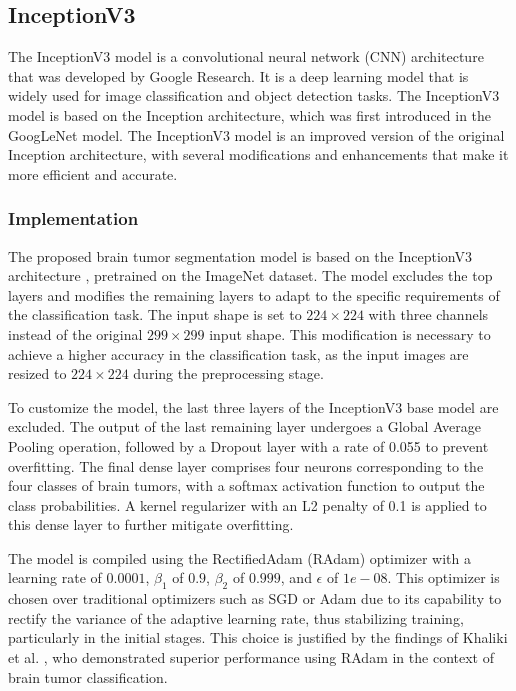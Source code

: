 \subsection{InceptionV3}\label{inceptionv3}

The InceptionV3 model is a convolutional neural network (CNN) architecture that was developed by Google Research. It is a deep learning model that is widely used for image classification and object detection tasks. The InceptionV3 model is based on the Inception architecture, which was first introduced in the GoogLeNet model. The InceptionV3 model is an improved version of the original Inception architecture, with several modifications and enhancements that make it more efficient and accurate.

\subsubsection{Implementation}


The proposed brain tumor segmentation model is based on the InceptionV3 architecture \cite{szegedy_rethinking_2015}, pretrained on the ImageNet dataset. The model excludes the top layers and modifies the remaining layers to adapt to the specific requirements of the classification task. The input shape is set to $224\times224$ with three channels instead of the original $299\times299$ input shape. This modification is necessary to achieve a higher accuracy in the classification task, as the input images are resized to $224\times224$ during the preprocessing stage.

To customize the model, the last three layers of the InceptionV3 base model are excluded. The output of the last remaining layer undergoes a Global Average Pooling operation, followed by a Dropout layer with a rate of 0.055 to prevent overfitting. The final dense layer comprises four neurons corresponding to the four classes of brain tumors, with a softmax activation function to output the class probabilities. A kernel regularizer with an L2 penalty of 0.1 is applied to this dense layer to further mitigate overfitting.

The model is compiled using the RectifiedAdam (RAdam) optimizer \cite{liu_variance_2019} with a learning rate of $0.0001$, $\beta_1$ of $0.9$, $\beta_2$ of $0.999$, and $\epsilon$ of $1e-08$. This optimizer is chosen over traditional optimizers such as SGD or Adam due to its capability to rectify the variance of the adaptive learning rate, thus stabilizing training, particularly in the initial stages. This choice is justified by the findings of Khaliki et al. \cite{khaliki_brain_2024}, who demonstrated superior performance using RAdam in the context of brain tumor classification.

